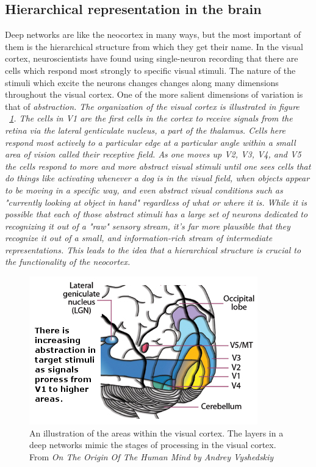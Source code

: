 \documentclass[12pt]{article}
\begin{document}
\begin{doublespacing}
	\subsection{Hierarchical representation in the brain}
		Deep networks are like the neocortex in many ways, but the most important of them is the hierarchical structure from which they get their name. In the visual cortex, neuroscientists have found using single-neuron recording that there are cells which respond most strongly to specific visual stimuli. The nature of the stimuli which excite the neurons changes changes along many dimensions throughout the visual cortex. One of the more salient dimensions of variation is that of \em abstraction\em\cite{hinton2005kind}. The organization of the visual cortex is illustrated in figure ~\ref{fig:visualcortex}. The cells in V1 are the first cells in the cortex to receive signals from the retina via the lateral genticulate nucleus, a part of the thalamus. Cells here respond most actively to a particular edge at a particular angle within a small area of vision called their receptive field. As one moves up V2, V3, V4, and V5 the cells respond to more and more abstract visual stimuli until one sees cells that do things like activating whenever a dog is in the visual field, when objects appear to be moving in a specific way, and even abstract visual conditions such as "currently looking at object in hand" regardless of what or where it is. While it is possible that each of those abstract stimuli has a large set of neurons dedicated to recognizing it out of a "raw" sensory stream, it's far more plausible that they recognize it out of a small, and information-rich stream of intermediate representations. This leads to the idea that a hierarchical structure is crucial to the functionality of the neocortex.
		
\begin{figure}[p]
\centering
\includegraphics[scale=0.8]{visual_cortex}
\caption{An illustration of the areas within the visual cortex. The layers in a deep networks mimic the stages of processing in the visual cortex. From \em On The Origin Of The Human Mind \em by Andrey Vyshedskiy \cite{vyshedskiy2008origin}}
\label{fig:visualcortex}
\end{figure}


\end{doublespacing}
\end{document}
